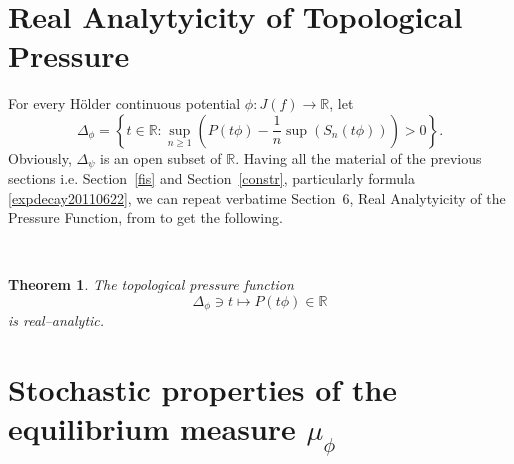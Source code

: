 \documentclass[12pt]{amsart}
\numberwithin{equation}{section}
\newcommand{\nl}{\newline}
\newtheorem{thm}{Theorem}[section]
\def\lt{\left}                \def\rt{\right}
\def\sp{\medskip}             \def\fr{\noindent}        \def\nl{\newline}
\begin{document}
\

\section{Real Analytyicity of Topological Pressure}

\sp\fr For every H\"older continuous potential $\phi:J(f)\to\mathbb{R}$, let
$$
\Delta_\phi=\lt\{t\in\mathbb{R}:\sup_{n\ge 1}\lt(
  P(t\phi)-\frac{1}{n}\sup (S_n(t\phi))\rt)>0\rt\}.
$$
Obviously, $\Delta_\psi$ is an open subset of $\mathbb{R}$. Having all
the material of the previous sections 
i.e. Section~\ref{fis} and Section~\ref{constr}, particularly 
formula \eqref{expdecay20110622}, we can repeat verbatime Section~6,
Real Analytyicity of the Pressure Function, from \cite{SUZ1} to get
the following. 

\

\begin{thm}\label{t1ai1}
The topological pressure function 
$$
\Delta_\phi\ni t\mapsto P(t\phi)\in\mathbb{R}
$$ 
is real--analytic.
\end{thm}

 
\section{Stochastic properties of the equilibrium
  measure $\mu_\phi$}\label{stochastic} 
\end{document}
